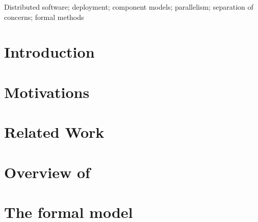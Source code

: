 \documentclass[5p]{elsarticle}
\begin{document}
\begin{frontmatter}
\begin{abstract}

\end{abstract}

\begin{keyword}
Distributed software; deployment; component models; parallelism; 
separation of concerns; formal methods
\end{keyword}

\end{frontmatter}


\section{Introduction}
\label{sec:introduction}


\section{Motivations}
\label{sec:motivation}


\section{Related Work}
\label{sec:related_work}


\section{Overview of \mad}
\label{sec:mad_model}


\section{The \mad formal model}
\label{sec:formal_model}

\end{document}
